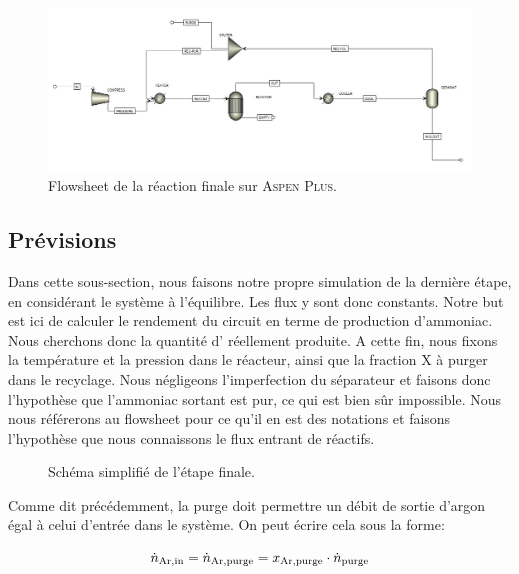 \begin{figure}[h!]
	\begin{center}
		\includegraphics[scale=0.45,angle=90]{../tache2/img_aspen/flowsheet.jpg}
	\end{center}
	\caption{Flowsheet de la réaction finale sur \textsc{Aspen Plus}.}
	\label{fig:flow_aspen}
\end{figure}

\subsection{Prévisions}

Dans cette sous-section, nous faisons notre propre simulation de la dernière étape, en considérant
le système à l'équilibre. Les flux y sont donc constants. Notre but est ici de calculer 
le rendement du circuit en terme de production d'ammoniac. 
Nous cherchons donc la quantité d' réellement produite.
A cette fin, nous fixons la température et la pression dans le réacteur, ainsi que la fraction X
à purger dans le recyclage.
Nous négligeons l'imperfection du séparateur et faisons donc l'hypothèse 
que l'ammoniac sortant est pur, ce qui est bien s\^ur impossible.
Nous nous référerons au flowsheet pour ce qu'il en est des notations et
faisons l'hypothèse que nous connaissons le flux entrant de réactifs.

\begin{figure}[h!]
	\begin{center}
		
	\end{center}
	\caption{Schéma simplifié de l'étape finale.}
	\label{fig:flow_synthese}
\end{figure}

Comme dit précédemment, la purge doit permettre un débit 
de sortie d'argon égal à celui d'entrée dans le système. 
On peut écrire cela sous la forme:

\begin{equation}
\dot{n}_{\ce{Ar},\text{in}} = \dot{n}_{\ce{Ar},\text{purge}} = 
x_{\ce{Ar},\text{purge}} \cdot \dot{n}_{\text{purge}}
\label{eq:bilan_tot_argon}
\end{equation}

